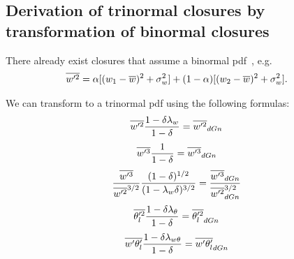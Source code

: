 \documentclass[10pt]{beamer}
\numberwithin{equation}{section}
\begin{document}
    \subsection{Derivation of trinormal closures by transformation of binormal closures}
    \label{subsec:derivation-of-trinormal-closures-by-transformation-of-binormal-closures}

    \begin{frame}
        There already exist closures that assume a binormal pdf~\autocite{larson2005using}, e.g.
        \begin{align}
            \label{eq:wp2_bar_dGn}
            \overline{w'^2}
            &= \alpha [(w_1 - \overline{w})^2 + \sigma_w^2]
            + (1 - \alpha) [(w_2 - \overline{w})^2 + \sigma_w^2].
        \end{align}
    \end{frame}

    \begin{frame}
        We can transform to a trinormal pdf using the following formulas:
        \begin{align}
            \label{eq:w_prime_2_transform}
            \overline{w'^2} \frac{1 - \delta\lambda_w}{1 - \delta}
            &= \overline{w'^2}_{dGn}
        \end{align}
        \begin{align}
            \label{eq:w_prime_3_transform}
            \overline{w'^3} \frac{1}{1 - \delta}
            &= \overline{w'^3}_{dGn}
        \end{align}
        \begin{align}
            \label{eq:w_prime_3_div_w_prime_2_transform}
            \frac{\overline{w'^3}}{\overline{w'^2}^{3/2}} \frac{(1 - \delta)^{1/2}}{(1 - \lambda_w\delta)^{3/2}}
            &= \frac{\overline{w'^3}_{dGn}}{\overline{w'^2}_{dGn}^{3/2}}
        \end{align}
        \begin{align}
            \label{eq:theta_l_prime_transform}
            \overline{\theta_l'^2} \frac{1 - \delta\lambda_\theta}{1 - \delta}
            &= \overline{\theta_l'^2}_{dGn}
        \end{align}
        \begin{align}
            \label{eq:w_prime_theta_l_prime_transform}
            \overline{w' \theta_l'} \frac{1 - \delta\lambda_{w\theta}}{1 - \delta}
            &= \overline{w' \theta_l'}_{dGn}
        \end{align}
    \end{frame}
\end{document}
